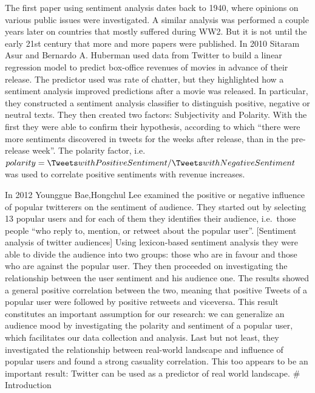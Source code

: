 \documentclass[
]{article}
\begin{document}
The first paper using sentiment analysis dates back to 1940, where
opinions on various public issues were investigated. A similar analysis
was performed a couple years later on countries that mostly suffered
during WW2. But it is not until the early 21st century that more and
more papers were published. In 2010 Sitaram Asur and Bernardo A.
Huberman used data from Twitter to build a linear regression model to
predict box-office revenues of movies in advance of their release. The
predictor used was rate of chatter, but they highlighted how a sentiment
analysis improved predictions after a movie was released. In particular,
they constructed a sentiment analysis classifier to distinguish
positive, negative or neutral texts. They then created two factors:
Subjectivity and Polarity. With the first they were able to confirm
their hypothesis, according to which ``there were more sentiments
discovered in tweets for the weeks after release, than in the
pre-release week''. The polarity factor,
i.e.~\(polarity= \Tweets with Positive Sentiment / \Tweets with Negative Sentiment\)
was used to correlate positive sentiments with revenue increases.

In 2012 Younggue Bae,Hongchul Lee examined the positive or negative
influence of popular twitterers on the sentiment of audience. They
started out by selecting 13 popular users and for each of them they
identifies their audience, i.e.~those people ``who reply to, mention, or
retweet about the popular user''. {[}Sentiment analysis of twitter
audiences{]} Using lexicon-based sentiment analysis they were able to
divide the audience into two groups: those who are in favour and those
who are against the popular user. They then proceeded on investigating
the relationship between the user sentiment and his audience one. The
results showed a general positive correlation between the two, meaning
that positive Tweets of a popular user were followed by positive
retweets and viceversa. This result constitutes an important assumption
for our research: we can generalize an audience mood by investigating
the polarity and sentiment of a popular user, which facilitates our data
collection and analysis. Last but not least, they investigated the
relationship between real-world landscape and influence of popular users
and found a strong casuality correlation. This too appears to be an
important result: Twitter can be used as a predictor of real world
landscape. \# Introduction
\end{document}
